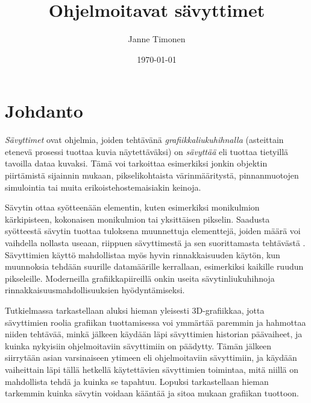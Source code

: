 \documentclass[finnish]{tktltiki2}
\title{Ohjelmoitavat sävyttimet}
\author{Janne Timonen}
\date{\today}
\theoremstyle{definition}
\theoremstyle{remark}
\begin{document}

\frontmatter      %

\maketitle        %
\makeabstract     %

\tableofcontents  %


\mainmatter       %

\section{Johdanto}


\emph{Sävyttimet} ovat ohjelmia, joiden tehtävänä \emph{grafiikkaliukuhihnalla} (asteittain etenevä prosessi tuottaa kuvia näytettäväksi) on \emph{sävyttää} eli tuottaa tietyillä tavoilla dataa kuvaksi. Tämä voi tarkoittaa esimerkiksi jonkin objektin piirtämistä sijainnin mukaan, pikselikohtaista värinmääritystä, pinnanmuotojen simulointia tai muita erikoistehostemaisiakin keinoja. 

Sävytin ottaa syötteenään elementin, kuten esimerkiksi monikulmion kärkipisteen, kokonaisen monikulmion tai yksittäisen pikselin. Saadusta syötteestä sävytin tuottaa tuloksena muunnettuja elementtejä, joiden määrä voi vaihdella nollasta useaan, riippuen sävyttimestä ja sen suorittamasta tehtävästä \cite[s. 500]{Gre14}. Sävyttimien käyttö mahdollistaa myös hyvin rinnakkaisuuden käytön, kun muunnoksia tehdään suurille datamäärille kerrallaan, esimerkiksi kaikille ruudun pikseleille. Moderneilla grafiikkapiireillä onkin useita sävytinliukuhihnoja rinnakkaisuusmahdollisuuksien hyödyntämiseksi.

Tutkielmassa tarkastellaan aluksi hieman yleisesti 3D-grafiikkaa, jotta sävyttimien roolia grafiikan tuottamisessa voi ymmärtää paremmin ja hahmottaa niiden tehtävää, minkä jälkeen käydään läpi sävyttimien historian päävaiheet, ja kuinka nykyisiin ohjelmoitaviin sävyttimiin on päädytty. Tämän jälkeen siirrytään asian varsinaiseen ytimeen eli ohjelmoitaviin sävyttimiin, ja käydään vaiheittain läpi tällä hetkellä käytettävien sävyttimien toimintaa, mitä niillä on mahdollista tehdä ja kuinka se tapahtuu. Lopuksi tarkastellaan hieman tarkemmin kuinka sävytin voidaan kääntää ja sitoa mukaan grafiikan tuottoon.
\end{document}

